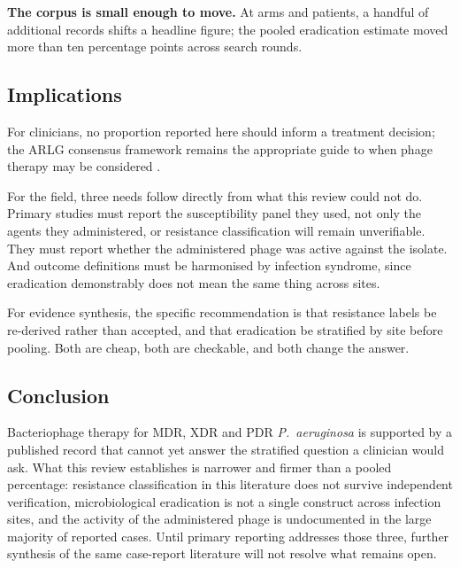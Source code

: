 \documentclass[12pt]{article}
\begin{document}
\textbf{The corpus is small enough to move.} At \ArmsAnalysed arms and \PatientsAnalysed patients, a handful of additional records shifts a headline figure; the pooled eradication estimate moved more than ten percentage points across search rounds.

\subsection*{Implications}

For clinicians, no proportion reported here should inform a treatment decision; the ARLG consensus framework remains the appropriate guide to when phage therapy may be considered \parencite{Suh2022_aac}.

For the field, three needs follow directly from what this review could not do. Primary studies must report the susceptibility panel they used, not only the agents they administered, or resistance classification will remain unverifiable. They must report whether the administered phage was active against the isolate. And outcome definitions must be harmonised by infection syndrome, since eradication demonstrably does not mean the same thing across sites.

For evidence synthesis, the specific recommendation is that resistance labels be re-derived rather than accepted, and that eradication be stratified by site before pooling. Both are cheap, both are checkable, and both change the answer.

\subsection*{Conclusion}

Bacteriophage therapy for MDR, XDR and PDR \textit{P.\ aeruginosa} is supported by a published record that cannot yet answer the stratified question a clinician would ask. What this review establishes is narrower and firmer than a pooled percentage: resistance classification in this literature does not survive independent verification, microbiological eradication is not a single construct across infection sites, and the activity of the administered phage is undocumented in the large majority of reported cases. Until primary reporting addresses those three, further synthesis of the same case-report literature will not resolve what remains open.

\clearpage
\small
\printbibliography
\end{document}
